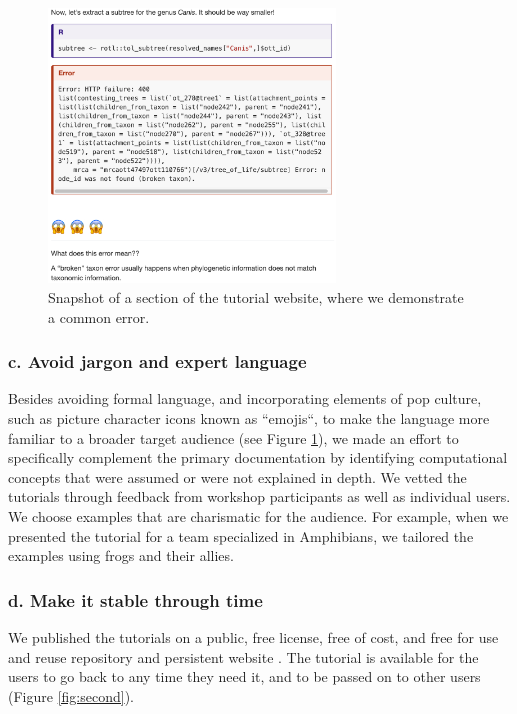 \documentclass[12pt]{article}
\begin{document}
\begin{figure}
\begin{center}
\includegraphics[width=3in]{fig1.png}
\end{center}
\caption{Snapshot of a section of the tutorial website, where we demonstrate a common error. \label{fig:first}}
\end{figure}

\subsubsection*{c. Avoid jargon and expert language}

Besides avoiding formal language, and incorporating elements of pop culture, such as picture
character icons known as ``emojis``, to make the language more familiar to a
broader target audience (see Figure \ref{fig:first}), we made an effort to specifically
complement the primary documentation by identifying
computational concepts that were assumed or were not explained in depth.
We vetted the tutorials through feedback from workshop participants as well as individual users.
We choose examples that are charismatic for the audience.
For example, when we presented the tutorial for a team specialized in Amphibians,
we tailored the examples using frogs and their allies.


\subsubsection*{d. Make it stable through time}

We published the tutorials on a public, free license, free of cost, and free for
use and reuse repository and persistent website \citep{RopentreeTutorials, RopentreeTutorialsWebsite}.
The tutorial is available for the users to go back to any time they need it,
and to be passed on to other users (Figure \ref{fig:second}).
\end{document}
